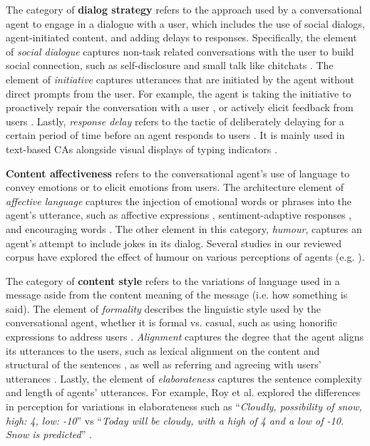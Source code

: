 The category of \textbf{dialog strategy} refers to the approach used by a conversational agent to engage in a dialogue with a user, which includes the use of social dialogs, agent-initiated content, and adding delays to responses. Specifically, the element of \textit{social dialogue} captures non-task related conversations with the user to build social connection, such as self-disclosure \cite{lee2020hear}\cmt{[23]} and small talk like chitchats \cite{lubold2016effects, volkel2021manipulating}\cmt{[86][68]}. The element of \textit{initiative} captures utterances that are initiated by the agent without direct prompts from the user. For example, the agent is taking the initiative to proactively repair the conversation with a user \cite{ashktorab2019resilient, cuadra2021my}\cmt{[88][67]}, or actively elicit feedback from users \cite{xiao2021let}\cmt{[73]}. Lastly, \textit{response delay} refers to the tactic of deliberately delaying for a certain period of time before an agent responds to users \cite{gnewuch2018faster, gnewuch2022opposing}\cmt{[19][20]}. It is mainly used in text-based CAs alongside visual displays of typing indicators \cite{gnewuch2018chatbot}\cmt{[21]}.

\textbf{Content affectiveness} refers to the conversational agent's use of language to convey emotions or to elicit emotions from users. The architecture element of \textit{affective language} captures the injection of emotional words or phrases into the agent's utterance, such as affective expressions \cite{seeger2021chatbots, yang2017perceived, zhu2022effects}\cmt{[35][44][26]}, sentiment-adaptive responses \cite{diederich2019emulating}\cmt{[25]}, and encouraging words \cite{healey2013relating}\cmt{[39]}. The other element in this category, \textit{humour}, captures an agent's attempt to include jokes in its dialog. Several studies in our reviewed corpus have explored the effect of humour on various perceptions of agents (e.g. \cite{ceha2021can, khooshabeh2011does}\cmt{[57][37]}).

The category of \textbf{content style} refers to the variations of language used in a message aside from the content meaning of the message (i.e. how something is said). The element of \textit{formality} describes the linguistic style used by the conversational agent, whether it is formal vs. casual, such as using honorific expressions to address users \cite{ouchi2019should}\cmt{[59]}. \textit{Alignment} captures the degree that the agent aligns its utterances to the users, such as lexical alignment on the content and structural of the sentences \cite{huiyang2022improving, linnemann2018can}\cmt{[17][15]}, as well as referring and agreeing with users' utterances \cite{volkel2021examining}\cmt{[69]}. Lastly, the element of \textit{elaborateness} captures the sentence complexity and length of agents' utterances. For example, Roy et al. explored the differences in perception for variations in elaborateness such as ``\textit{Cloudly, possibility of snow, high: 4, low: -10}'' vs ``\textit{Today will be cloudy, with a high of 4 and a low of -10. Snow is predicted}'' \cite{roy2021users}\cmt{[71]}.

